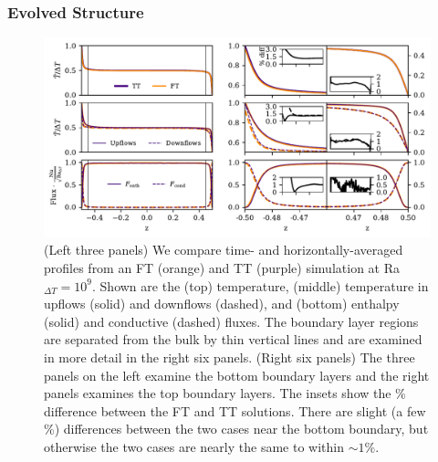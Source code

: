\subsubsection{Evolved Structure}
\vspace{-0.5cm}
\begin{figure}
\includegraphics[width=\textwidth]{./figs/rbc_1D_profiles.pdf}
\caption[1D profiles of temperatures and fluxes in TT and FT simulations]{ 
	(Left three panels) We compare time- and horizontally-averaged profiles from an FT (orange) and TT (purple) simulation at Ra$_{\Delta T} = 10^{9}$.
	Shown are the (top) temperature, (middle) temperature in upflows (solid) and downflows (dashed), and (bottom) enthalpy (solid) and conductive (dashed) fluxes.
	The boundary layer regions are separated from the bulk by thin vertical lines and are examined in more detail in the right six panels.
	(Right six panels) The three panels on the left examine the bottom boundary layers and the right panels examines the top boundary layers.
	The insets show the \% difference between the FT and TT solutions.
	There are slight (a few \%) differences between the two cases near the bottom boundary, but otherwise the two cases are nearly the same to within $\sim 1$\%.
\label{fig:rbc_1D_profiles} }
\vspace{0.5cm}
\end{figure}

